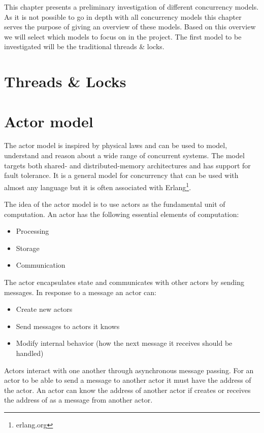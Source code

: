 \makeatletter {}\makeatother
{}
This chapter presents a preliminary investigation of different concurrency models. As it is not possible to go in depth with all concurrency models this chapter serves the purpose of giving an overview of these models. Based on this overview we will select which models to focus on in the project. The first model to be investigated will be the traditional threads \& locks.

\section{Threads \& Locks}
\section{Actor model}
The actor model is inspired by physical laws and can be used to model, understand and reason about a wide range of concurrent systems\cite{hewitt2014actor}. The model targets both shared- and distributed-memory architectures and has support for fault tolerance\cite[Chap. 5]{sevenModels}. It is a general model for concurrency that can be used with almost any language but it is often associated with Erlang\footnote{erlang.org}.
 
The idea of the actor model is to use actors as the fundamental unit of computation. An actor has the following essential elements of computation\cite{actorLangNextVideo}:
\begin{itemize}
	\item Processing
	\item Storage
	\item Communication
\end{itemize}
The actor encapsulates state and communicates with other actors by sending messages. In response to a message an actor can\cite{hewitt2014actor}:
\begin{itemize}
\item Create new actors
\item Send messages to actors it knows
\item Modify internal behavior (how the next message it receives should be handled)
\end{itemize}
Actors interact with one another through asynchronous message passing. For an actor to be able to send a message to another actor it must have the address of the actor. An actor  can know the address of another actor  if  creates  or receives the address of  as a message from another actor.

